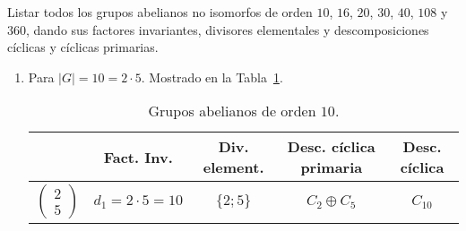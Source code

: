 \begin{ejercicio}\label{ej:7.6}
    Listar todos los grupos abelianos no isomorfos de orden $10$, $16$, $20$, $30$, $40$, $108$ y $360$, dando sus factores invariantes, divisores elementales y descomposiciones cíclicas y cíclicas primarias.
    \begin{enumerate}
        \item Para $|G|=10=2\cdot 5$.
        Mostrado en la Tabla~\ref{tab:grupos_abelianos_10}.
        \begin{table}[h]
            \centering
            \begin{tabular}{c|c|c|c|c}
                & \textbf{Fact. Inv.} & \textbf{Div. element.} & \textbf{Desc. cíclica primaria} & \textbf{Desc. cíclica} \\
                \hline
                $\begin{pmatrix}
                    2 \\
                    5
                \end{pmatrix}
                $ & $d_1=2\cdot 5=10$ & $\{2; 5\}$ & $C_2 \oplus C_5$ & $C_{10}$
            \end{tabular}
            \caption{Grupos abelianos de orden $10$.}
            \label{tab:grupos_abelianos_10}
        \end{table}


\end{enumerate}
\end{ejercicio}
